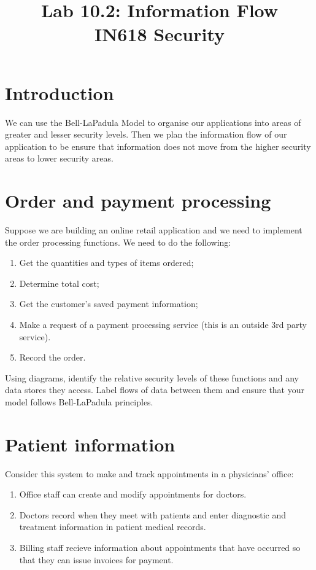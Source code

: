 \documentclass{article}
\begin{document}
\title{ Lab 10.2: Information Flow \\ IN618 Security}
\maketitle

\section*{Introduction}
We can use the Bell-LaPadula Model to organise our applications into areas of greater and lesser security levels. Then we plan the information flow of our application to be ensure that information does not move from the higher security areas to lower security areas.

\section{Order and payment processing}
Suppose we are building an online retail application and we need to implement the order processing functions.  We need to do the following:
\begin{enumerate}
	\item Get the quantities and types of items ordered;
	\item Determine total cost;
	\item Get the customer's saved payment information;
	\item Make a request of a payment processing service (this is an outside 3rd party service).
	\item Record the order.
\end{enumerate}

Using diagrams, identify the relative security levels of these functions and any data stores they access.  Label flows of data between them and ensure that your model follows Bell-LaPadula principles.

\newpage

\section{Patient information}  
Consider this system to make and track appointments in a physicians' office:
\begin{enumerate}
	\item Office staff can create and modify appointments for doctors.
	\item Doctors record when they meet with patients and enter diagnostic and treatment information in patient medical records.
	\item Billing staff recieve information about appointments that have occurred so that they can issue invoices for payment.
\end{enumerate}
\end{document}
